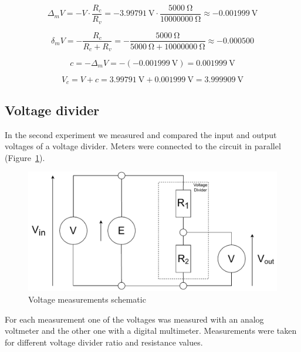 \begin{equation}
	\Delta_m V = -V\cdot\frac{R_c}{R_v} = -\SI{3.99791}{\volt}\cdot\frac{\SI{5000}{\ohm}}{\SI{10000000}{\ohm}} \approx -\SI{0.001999}{\volt}
	\label{eq:digital_Delta_m}
\end{equation}

\begin{equation}
	\delta_m V = -\frac{R_c}{R_c + R_v} = -\frac{\SI{5000}{\ohm}}{\SI{5000}{\ohm} + \SI{10000000}{\ohm}} \approx -0.000500
	\label{eq:digital_delta_m}
\end{equation}

\begin{equation}
	c = -\Delta_m V = -(-\SI{0.001999}{\volt}) = \SI{0.001999}{\volt}
	\label{eq:digital_c}
\end{equation}

\begin{equation}
	V_c = V + c = \SI{3.99791}{\volt} + \SI{0.001999}{\volt} = \SI{3.999909}{\volt}
	\label{eq:digital_V_c}
\end{equation}


\subsection{Voltage divider}

In the second experiment we measured and compared the input and output voltages of a voltage divider. Meters were connected to the circuit in parallel (Figure~\ref{fig:voltage_divider_schematic}).

\begin{figure}[H]
	\centering
	\includegraphics[width=12cm]{schematics/voltage_divider.pdf}
	\caption{Voltage measurements schematic}
	\label{fig:voltage_divider_schematic}
\end{figure}

For each measurement one of the voltages was measured with an analog voltmeter and the other one with a digital multimeter. Measurements were taken for different voltage divider ratio and resistance values.

